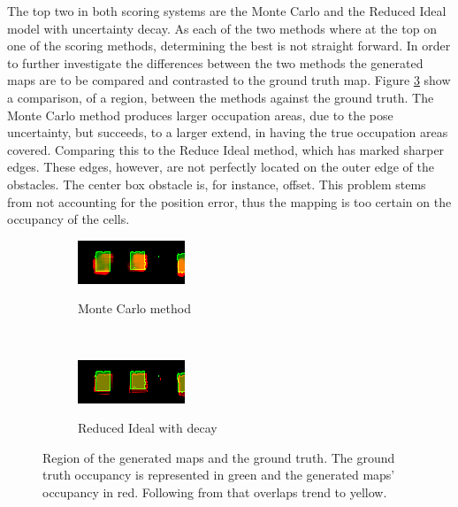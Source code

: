 The top two in both scoring systems are the Monte Carlo and the Reduced Ideal model with uncertainty decay. As each of the two methods where at the top on one of the scoring methods, determining the best is not straight forward.
In order to further investigate the differences between the two methods the generated maps are to be compared and contrasted to the ground truth map. Figure \ref{fig:box_region_comparison} show a comparison, of a region, between the methods against the ground truth.
The Monte Carlo method produces larger occupation areas, due to the pose uncertainty, but succeeds, to a larger extend, in having the true occupation areas covered. Comparing this to the Reduce Ideal method, which has marked sharper edges. 
These edges, however, are not perfectly located on the outer edge of the obstacles. 
The center box obstacle is, for instance, offset. 
This problem stems from not accounting for the position error, thus the mapping is too certain on the occupancy of the cells. 

\begin{figure}[tbph]
	\centering
	\begin{subfigure}[t]{0.45\textwidth}
		\includegraphics[scale=1.5]{figures/static_mapping/color_diff_monte_carlo}		
		\label{fig:monte_carlo_mapsec1}
		\caption{Monte Carlo method}
	\end{subfigure}
	~ %
	\begin{subfigure}[t]{0.45\textwidth}
		\includegraphics[scale=1.5]{figures/static_mapping/color_diff_ideal_decay}
		\label{fig:ideal_deacy_mapsec1}
		\caption{Reduced Ideal with decay}
	\end{subfigure}
	\caption{Region of the generated maps and the ground truth. The ground truth occupancy is represented in green and the generated maps' occupancy in red. Following from that overlaps trend to yellow.}
	\label{fig:box_region_comparison}
\end{figure}
